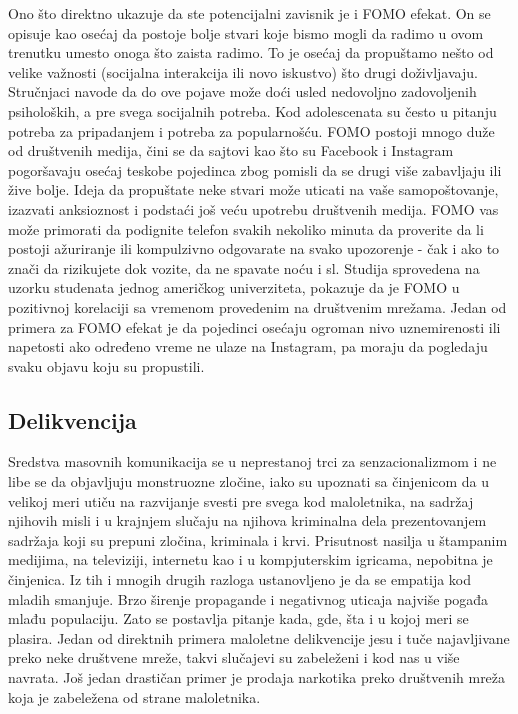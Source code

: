 \documentclass[a4paper]{article}
\begin{document}
{		Ono što direktno ukazuje da ste potencijalni zavisnik je i FOMO efekat. On se opisuje kao osećaj da postoje bolje stvari koje bismo mogli da radimo u ovom trenutku umesto onoga što zaista radimo. To je osećaj da propuštamo nešto od velike važnosti (socijalna interakcija ili novo iskustvo) što drugi doživljavaju. Stručnjaci navode da do ove pojave može doći usled nedovoljno zadovoljenih psiholoških, a pre svega socijalnih potreba. Kod adolescenata su često u pitanju potreba za pripadanjem i potreba za popularnošću. FOMO postoji mnogo duže od društvenih medija, čini se da sajtovi kao što su Facebook i Instagram pogoršavaju osećaj teskobe pojedinca zbog pomisli da se drugi više zabavljaju ili žive bolje. Ideja da propuštate neke stvari može uticati na vaše samopoštovanje, izazvati anksioznost i podstaći još veću upotrebu društvenih medija. FOMO vas može primorati da podignite telefon svakih nekoliko minuta da proverite da li postoji ažuriranje ili kompulzivno odgovarate na svako upozorenje - čak i ako to znači da rizikujete dok vozite, da ne spavate noću i sl. Studija sprovedena na uzorku studenata jednog američkog univerziteta, pokazuje da je FOMO u pozitivnoj korelaciji sa vremenom provedenim na društvenim mrežama. Jedan od primera za FOMO efekat je da pojedinci osećaju ogroman nivo uznemirenosti  ili napetosti ako određeno vreme ne ulaze na Instagram, pa moraju da pogledaju svaku objavu koju su propustili.
		
		\subsection{Delikvencija}
		
		Sredstva masovnih komunikacija se u neprestanoj trci za senzacionalizmom i ne
		libe se da objavljuju monstruozne zločine, iako su upoznati sa činjenicom da u velikoj meri utiču na razvijanje svesti pre svega kod maloletnika, na sadržaj njihovih misli i u krajnjem slučaju na njihova kriminalna dela prezentovanjem sadržaja koji su prepuni zločina, kriminala i krvi. Prisutnost nasilja u štampanim medijima, na televiziji, internetu kao i u kompjuterskim igricama, nepobitna je činjenica. Iz tih i mnogih drugih razloga ustanovljeno je da se empatija kod mladih smanjuje. Brzo širenje propagande i negativnog uticaja najviše pogađa mlađu populaciju. Zato se postavlja pitanje kada, gde, šta i u kojoj meri se plasira. Jedan od direktnih primera maloletne delikvencije jesu i tuče najavljivane preko neke društvene mreže, takvi slučajevi su zabeleženi i kod nas u više navrata. Još jedan drastičan primer je prodaja narkotika preko društvenih mreža koja je zabeležena od strane maloletnika.
		
}
\end{document}
